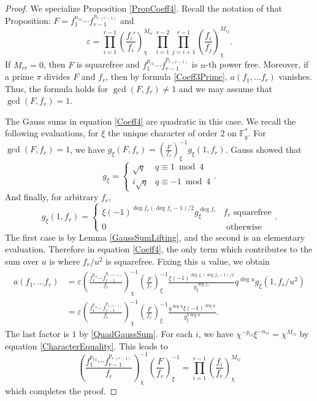 \documentclass[11pt,letterpaper]{article}
\theoremstyle{definition}
\theoremstyle{remark}
\numberwithin{equation}{section}
\theoremstyle{dotless}
\newcommand{\F}{\mathbb{F}}
\newcommand{\res}[2]{\left(\frac{#1}{#2}\right)}
\begin{document}
\begin{proof}
We specialize Proposition \ref{PropCoeff4}. Recall the notation of that Proposition: $F=f_1^{n_{ri}}\cdots f_{r-1}^{n_{r \, (r-1)}}$ and
\begin{equation*}
\varepsilon= \prod_{i=1}^{r-1} \res{f_i'}{f_i}_{\chi}^{M_{ii}} \, \prod_{i=1}^{r-2}\prod_{j=i+1}^{r-1} \res{f_i}{f_j}_{\chi}^{M_{ij}}.
\end{equation*} 
If $M_{rr}=0$, then  $F$ is squarefree and $f_1^{p_{r1}}\cdots f_{r-1}^{p_{r \, (r-1)}}$ is $n$-th power free. Moreover, if a prime $\pi$ divides $F$ and $f_r$, then by formula \eqref{Coeff3Prime}, $a(f_1, \ldots f_r)$ vanishes. Thus, the formula holds for $\gcd(F, f_r) \neq 1$ and we may assume that $\gcd(F, f_r)=1$. 

The Gauss sums in equation \eqref{Coeff4} are quadratic in this case. We recall the following evaluations, for $\xi$ the unique character of order $2$ on $\F_q^*$. For $\gcd(F, f_r)=1$, we have $g_{\xi}(F, f_r) = \res{F}{f_r}_{\xi}^{-1} g_{\xi}(1, f_r)$. Gauss showed that
\begin{equation} \label{QuadGaussSum}
g_{\xi} = \left\lbrace \begin{array}{cc} \sqrt{q} & q \equiv 1 \bmod 4 \\ i\sqrt{q} & q \equiv -1 \bmod 4 \end{array}\right. .
\end{equation}
And finally, for arbitrary $f_r$, 
\begin{equation*}
g_{\xi}(1, f_r) = \left\lbrace \begin{array}{cc} \xi(-1)^{\deg f_r(\deg f_r-1)/2} g_{\xi}^{\deg f_r} & f_r \text{ squarefree} \\ 0 & \text{ otherwise} \end{array}\right. .
\end{equation*}
The first case is by Lemma \ref{GaussSumLifting}, and the second is an elementary evaluation. Therefore in equation \eqref{Coeff4}, the only term which contributes to the sum over $u$ is where $f_r/u^2$ is squarefree. Fixing this $u$ value, we obtain
\begin{equation*} 
\begin{split}
a(f_1, \ldots f_r) &= \varepsilon \res{f_1^{p_{r1}}\cdots f_{r-1}^{p_{r \, (r-1)}}}{f_r}^{-1}_{\chi} \res{F}{f_r}_{\xi}^{-1} \frac{\xi(-1)^{\deg f_r(\deg f_r -1)/2}}{g_{\xi}^{\deg f_r}} q^{\deg u} g_{\xi}(1, f_r/u^2) \\
&=\varepsilon \res{f_1^{p_{r1}}\cdots f_{r-1}^{p_{r \, (r-1)}}}{f_r}^{-1}_{\chi} \res{F}{f_r}_{\xi}^{-1} \frac{q^{\deg u} \xi(-1)^{\deg u}}{g_{\xi}^{2 \deg u}} .
\end{split}
\end{equation*}
The last factor is $1$ by \eqref{QuadGaussSum}. For each $i$, we have $\chi^{-p_{ri}}\xi^{-n_{ri}} = \chi^{M_{ri}}$ by equation \eqref{CharacterEquality}. This leads to 
\begin{equation*}
\res{f_1^{p_{r1}}\cdots f_{r-1}^{p_{r \, (r-1)}}}{f_r}^{-1}_{\chi} \res{F}{f_r}_{\xi}^{-1} = \prod_{i=1}^{r-1} \res{f_i}{f_r}_{\chi}^{M_{ri}}
\end{equation*}
which completes the proof. 
\end{proof}
\end{document}
